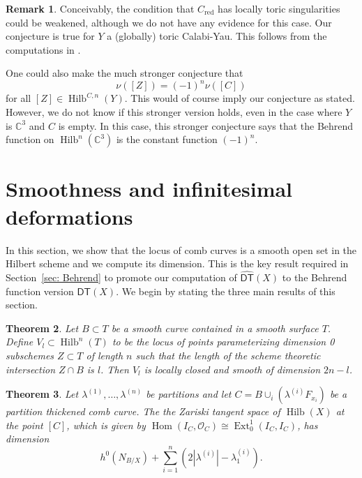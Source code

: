 \documentclass{amsart}
\newtheorem{theorem}{Theorem}%
\theoremstyle{definition}
\newtheorem{remark}[theorem]{Remark}
\newcommand{\CC} {\mathbb{C}}          %
\renewcommand{\O}{\mathcal{O}}
\newcommand{\Hom}{\operatorname{Hom}}
\newcommand{\Ext}{\operatorname{Ext}}
\newcommand{\Hilb}{\operatorname{Hilb}}
\newcommand{\DT}{\mathsf{DT}}
\newcommand{\DThat}{\widehat{\DT}}
\newcommand{\red}{\mathrm{red}}
\begin{document}
\begin{remark}
Conceivably, the condition that $C_{\red}$ has locally toric
singularities could be weakened, although we do not have any evidence
for this case. Our conjecture is true for $Y$ a (globally) toric
Calabi-Yau. This follows from the computations in \cite{MNOP1}.

One could also make the much stronger conjecture that 
\[
\nu ([Z]) = (-1)^{n} \nu ([C])
\]
for all $[Z]\in \Hilb^{C,n}(Y)$. This would of course imply our
conjecture as stated. However, we do not know if this stronger version
holds, even in the case where $Y$ is $\CC^{3}$ and $C$ is empty. In
this case, this stronger conjecture says that the Behrend function
on $\Hilb^{n}(\CC^{3})$ is the constant function $(-1)^{n}$.
\end{remark}


\section{Smoothness and infinitesimal deformations}\label{sec: smoothness and deformations}

In this section, we show that the locus of comb curves is a smooth
open set in the Hilbert scheme and we compute its dimension. This is
the key result required in Section~\ref{sec: Behrend} to promote our
computation of $\DThat (X)$ to the Behrend function version $\DT
(X)$. We begin by stating the three main results of this section.

\begin{theorem}\label{thm: strata of Hilb(C^2) with fixed intersection
is smooth} Let $B\subset T$ be a smooth curve contained in a smooth
surface $T$. Define $V_{l}\subset \Hilb^{n}(T)$ to be the locus of
points parameterizing dimension 0 subschemes $Z\subset T$ of length
$n$ such that the length of the scheme theoretic intersection $Z\cap
B$ is $l$. Then $V_{l}$ is locally closed and smooth of dimension
$2n-l$.
\end{theorem}

\begin{theorem}\label{thm: Ext computation}
Let $\lambda^{(1)},\dotsc ,\lambda^{(n)}$ be partitions and let
$C=B\cup_{i}\left(\lambda^{(i)}F_{x_{i}} \right)$ be a partition
thickened comb curve. The the Zariski tangent space of $\Hilb (X)$ at
the point $[C]$, which is given by $\Hom (I_{C},\O_{C})\cong
\Ext^{1}_{0}(I_{C},I_{C})$, has dimension
\[
h^{0}(N_{B/X}) + \sum_{i=1}^{n}\left(2|\lambda^{(i)}| - \lambda_{1}^{(i)} \right).
\]
\end{theorem}
\end{document}
